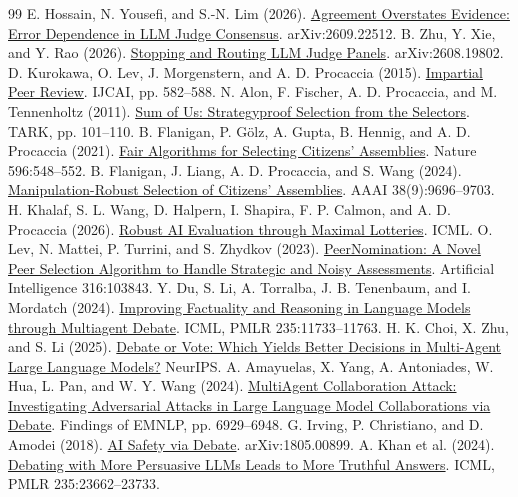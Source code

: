 \documentclass[11pt,letterpaper]{article}
\begin{document}
\begin{thebibliography}{99}
 E. Hossain, N. Yousefi, and S.-N. Lim (2026). \href{https://arxiv.org/abs/2609.22512}{Agreement Overstates Evidence: Error Dependence in LLM Judge Consensus}. arXiv:2609.22512.
 B. Zhu, Y. Xie, and Y. Rao (2026). \href{https://arxiv.org/abs/2608.19802}{Stopping and Routing LLM Judge Panels}. arXiv:2608.19802.
 D. Kurokawa, O. Lev, J. Morgenstern, and A. D. Procaccia (2015). \href{https://www.ijcai.org/Abstract/15/088}{Impartial Peer Review}. IJCAI, pp. 582--588.
 N. Alon, F. Fischer, A. D. Procaccia, and M. Tennenholtz (2011). \href{https://doi.org/10.1145/2000378.2000390}{Sum of Us: Strategyproof Selection from the Selectors}. TARK, pp. 101--110.
 B. Flanigan, P. G\"olz, A. Gupta, B. Hennig, and A. D. Procaccia (2021). \href{https://doi.org/10.1038/s41586-021-03788-6}{Fair Algorithms for Selecting Citizens' Assemblies}. Nature 596:548--552.
 B. Flanigan, J. Liang, A. D. Procaccia, and S. Wang (2024). \href{https://doi.org/10.1609/aaai.v38i9.28827}{Manipulation-Robust Selection of Citizens' Assemblies}. AAAI 38(9):9696--9703.
 H. Khalaf, S. L. Wang, D. Halpern, I. Shapira, F. P. Calmon, and A. D. Procaccia (2026). \href{https://arxiv.org/abs/2602.21297}{Robust AI Evaluation through Maximal Lotteries}. ICML.
 O. Lev, N. Mattei, P. Turrini, and S. Zhydkov (2023). \href{https://doi.org/10.1016/j.artint.2022.103843}{PeerNomination: A Novel Peer Selection Algorithm to Handle Strategic and Noisy Assessments}. Artificial Intelligence 316:103843.
 Y. Du, S. Li, A. Torralba, J. B. Tenenbaum, and I. Mordatch (2024). \href{https://proceedings.mlr.press/v235/du24e.html}{Improving Factuality and Reasoning in Language Models through Multiagent Debate}. ICML, PMLR 235:11733--11763.
 H. K. Choi, X. Zhu, and S. Li (2025). \href{https://arxiv.org/abs/2508.17536}{Debate or Vote: Which Yields Better Decisions in Multi-Agent Large Language Models?} NeurIPS.
 A. Amayuelas, X. Yang, A. Antoniades, W. Hua, L. Pan, and W. Y. Wang (2024). \href{https://arxiv.org/abs/2406.14711}{MultiAgent Collaboration Attack: Investigating Adversarial Attacks in Large Language Model Collaborations via Debate}. Findings of EMNLP, pp. 6929--6948.
 G. Irving, P. Christiano, and D. Amodei (2018). \href{https://arxiv.org/abs/1805.00899}{AI Safety via Debate}. arXiv:1805.00899.
 A. Khan et al. (2024). \href{https://proceedings.mlr.press/v235/khan24a.html}{Debating with More Persuasive LLMs Leads to More Truthful Answers}. ICML, PMLR 235:23662--23733.

\end{thebibliography}
\end{document}
